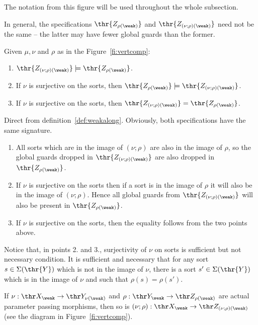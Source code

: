 \noindent
The notation from this figure will be used throughout the whole subsection.

In general, the specifications $\thr{Z_{\rho(\weak)}}$ and
$\thr{Z_{(\nu;\rho)(\weak)}}$ need not be the same -- the latter may have
fewer global guards than the former.
\begin{fact}\label{fa:triv}
Given $\mu,\nu$ and $\rho$ as in the Figure~\ref{fi:vertcomp}:
\begin{enumerate}\MyLPar
\item $\thr{Z_{(\nu;\rho)(\weak)}}\models \thr{Z_{\rho(\weak)}}$.
\item If $\nu$ is surjective on the sorts, then $\thr{Z_{\rho(\weak)}}\models
\thr{Z_{(\nu;\rho)(\weak)}}$.
\item If $\nu$ is
surjective on the sorts, then $\thr{Z_{(\nu;\rho)(\weak)}} = \thr{Z_{\rho(\weak)}}$.
\end{enumerate}
\end{fact}
\begin{PROOF}
Direct from definition~\ref{def:weakalong}. Obviously, both specifications
have the same signature. 
\begin{enumerate}\MyLPar
\item  All sorts which are in the
image of $(\nu;\rho)$ are also in the image of $\rho$, so the global guards
dropped in $\thr{Z_{(\nu;\rho)(\weak)}}$ are also dropped in
$\thr{Z_{\rho(\weak)}}$. 
\item If $\nu$ is surjective on the sorts then if a sort is in the image of
$\rho$ it will also be in the image of $(\nu;\rho)$. Hence all global guards
from $\thr{Z_{(\nu;\rho)(\weak)}}$ will also be present in $\thr{Z_{\rho(\weak)}}$.
\item If $\nu$ is surjective on the sorts, then the equality follows from the
two points above. \vspace*{-2ex}
\end{enumerate}
\end{PROOF}
Notice that, in points 2. and 3., surjectivity of $\nu$ on sorts is sufficient but
not necessary condition. It is sufficient and necessary that for any sort $s\in\Sigma(\thr{Y})$
which is not in the image of $\nu$, there is a sort  $s'\in\Sigma(\thr{Y})$ which
is in the image of $\nu$ and such that $\rho(s)=\rho(s')$.
%
\begin{proposition}\label{prop:vertcomp}
If 
$\nu:\thr X_\weak\to \thr Y_{\nu(\weak)}$ and $\rho:\thr Y_\weak\to \thr Z_{\rho(\weak)}$
 are actual parameter passing
morphisms, then so is $(\nu;\rho):\thr X_\weak \to \thr Z_{(\nu;\rho)(\weak)}$
(see the diagram in Figure~\ref{fi:vertcomp}). 
\end{proposition}
